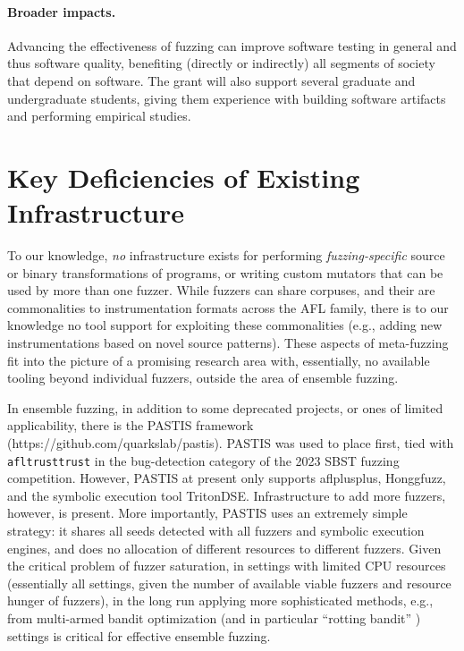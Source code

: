 \paragraph{Broader impacts.} Advancing the effectiveness of fuzzing can improve 
software testing in general and
thus software quality, benefiting (directly or indirectly) all
segments of society that depend on software.  The grant
will also support several graduate and undergraduate students, giving them 
experience with
building software artifacts and performing empirical studies.


\section{Key Deficiencies of Existing Infrastructure}

To our knowledge, \emph{no} infrastructure exists for performing 
\emph{fuzzing-specific} source or binary transformations of programs, or writing 
custom mutators that can be used by more than one fuzzer.  While
fuzzers can share corpuses, and their are commonalities to
instrumentation formats across the AFL family, there is to our
knowledge no tool support for exploiting these commonalities (e.g.,
adding new instrumentations based on novel source patterns).  These aspects of meta-fuzzing fit into the picture of a promising 
research area with, essentially, no available tooling beyond individual 
fuzzers, outside the area of ensemble fuzzing.

In ensemble fuzzing, in addition to some deprecated projects, or ones of 
limited applicability, there is the PASTIS framework 
(https://github.com/quarkslab/pastis).  PASTIS was used to place first, tied 
with {\tt afltrusttrust} in the bug-detection category of the 2023 SBST fuzzing 
competition.  However, PASTIS at present only supports aflplusplus, Honggfuzz, 
and the symbolic execution tool TritonDSE.  Infrastructure to add more fuzzers, 
however, is present.  More importantly, PASTIS uses an extremely simple 
strategy:  it shares all seeds detected with all fuzzers and symbolic execution 
engines, and does no allocation of different resources to different fuzzers.  
Given the critical problem of fuzzer saturation, in settings with limited CPU 
resources (essentially all settings, given the number of available viable 
fuzzers and resource hunger of fuzzers), in the long run applying more 
sophisticated methods, e.g., from multi-armed bandit optimization (and in 
particular ``rotting bandit'' \cite{}) settings is critical for effective 
ensemble fuzzing.

